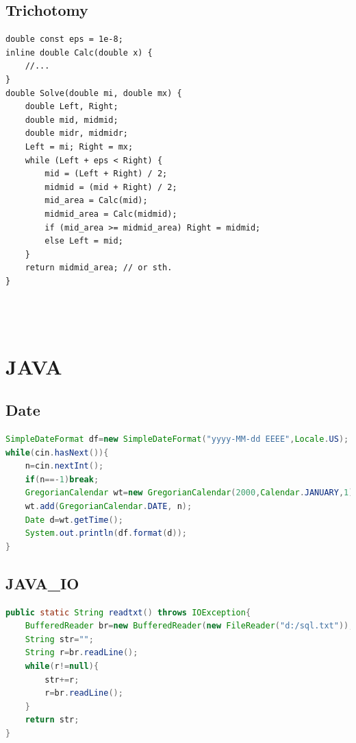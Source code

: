\documentclass[twocolumn]{article}
\begin{document}
\begin{twocolumn}
\subsection{Trichotomy}
\begin{lstlisting}[language={[ANSI]C}]
double const eps = 1e-8;
inline double Calc(double x) {
    //...
}
double Solve(double mi, double mx) {
    double Left, Right;
    double mid, midmid;
    double midr, midmidr;
    Left = mi; Right = mx;
    while (Left + eps < Right) {
        mid = (Left + Right) / 2;
        midmid = (mid + Right) / 2;
        mid_area = Calc(mid);
        midmid_area = Calc(midmid);
        if (mid_area >= midmid_area) Right = midmid;
        else Left = mid;
    }
    return midmid_area; // or sth.
}
\end{lstlisting}

\begin{lstlisting}[language={[ANSI]C}]
\end{lstlisting}
\begin{lstlisting}[language={[ANSI]C}]
\end{lstlisting}
\begin{lstlisting}[language={[ANSI]C}]
\end{lstlisting}
\begin{lstlisting}[language={[ANSI]C}]
\end{lstlisting}

\newpage
\section{JAVA}
\subsection{Date}
\begin{lstlisting}[language={Java}]
SimpleDateFormat df=new SimpleDateFormat("yyyy-MM-dd EEEE",Locale.US);
while(cin.hasNext()){
    n=cin.nextInt();
    if(n==-1)break;
    GregorianCalendar wt=new GregorianCalendar(2000,Calendar.JANUARY,1);
    wt.add(GregorianCalendar.DATE, n);
    Date d=wt.getTime();
    System.out.println(df.format(d));
}
\end{lstlisting}

\subsection{JAVA\_IO}
\begin{lstlisting}[language={Java}]
public static String readtxt() throws IOException{
    BufferedReader br=new BufferedReader(new FileReader("d:/sql.txt"));
    String str="";
    String r=br.readLine();
    while(r!=null){
        str+=r;
        r=br.readLine();
    }
    return str;
}
\end{lstlisting}



\end{twocolumn}
\end{document}
